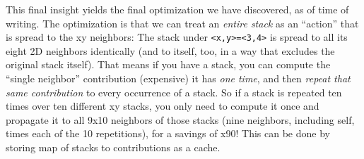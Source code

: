 \documentclass[]{article}
\begin{document}
This final insight yields the final optimization we have discovered, as of time
of writing. The optimization is that we can treat an \emph{entire stack} as an
``action'' that is spread to the xy neighbors: The stack under
\texttt{\textless{}x,y\textgreater{}=\textless{}3,4\textgreater{}} is spread to
all its eight 2D neighbors identically (and to itself, too, in a way that
excludes the original stack itself). That means if you have a stack, you can
compute the ``single neighbor'' contribution (expensive) it has \emph{one time},
and then \emph{repeat that same contribution} to every occurrence of a stack. So
if a stack is repeated ten times over ten different xy stacks, you only need to
compute it once and propagate it to all 9x10 neighbors of those stacks (nine
neighbors, including self, times each of the 10 repetitions), for a savings of
x90! This can be done by storing map of stacks to contributions as a cache.
\end{document}
